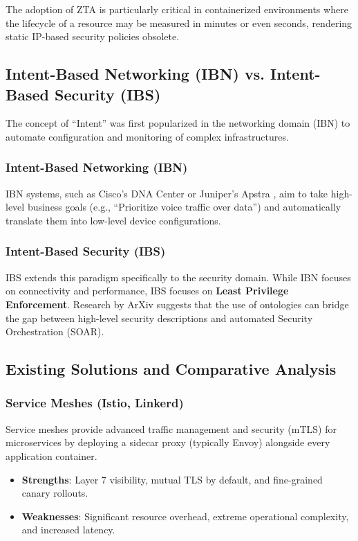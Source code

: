 \documentclass[12pt,a4paper]{article}
\begin{document}
The adoption of ZTA is particularly critical in containerized environments where the lifecycle of a resource may be measured in minutes or even seconds, rendering static IP-based security policies obsolete.

\subsection{Intent-Based Networking (IBN) vs. Intent-Based Security (IBS)}
The concept of ``Intent'' was first popularized in the networking domain (IBN) to automate configuration and monitoring of complex infrastructures.

\subsubsection{Intent-Based Networking (IBN)}
IBN systems, such as Cisco’s DNA Center or Juniper’s Apstra \cite{cisco2023ibn}, aim to take high-level business goals (e.g., ``Prioritize voice traffic over data'') and automatically translate them into low-level device configurations.

\subsubsection{Intent-Based Security (IBS)}
IBS extends this paradigm specifically to the security domain. While IBN focuses on connectivity and performance, IBS focuses on \textbf{Least Privilege Enforcement}. Research by ArXiv \cite{doe2021bridging} suggests that the use of ontologies can bridge the gap between high-level security descriptions and automated Security Orchestration (SOAR).

\subsection{Existing Solutions and Comparative Analysis}

\subsubsection{Service Meshes (Istio, Linkerd)}
Service meshes provide advanced traffic management and security (mTLS) for microservices by deploying a sidecar proxy (typically Envoy) alongside every application container.
\begin{itemize}
    \item \textbf{Strengths}: Layer 7 visibility, mutual TLS by default, and fine-grained canary rollouts.
    \item \textbf{Weaknesses}: Significant resource overhead, extreme operational complexity, and increased latency. 
\end{itemize}
\end{document}
